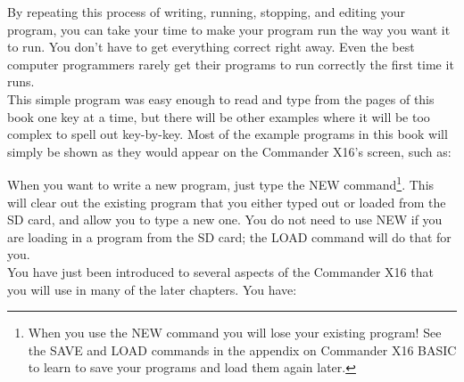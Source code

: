By repeating this process of writing, running, stopping, and editing your
program, you can take your time to make your program run the way you want it to
run.  You don't have to get everything correct right away.  Even the best
computer programmers rarely get their programs to run correctly the first time
it runs.\\

This simple program was easy enough to read and type from the pages of this
book one key at a time, but there will be other examples where it will be too
complex to spell out key-by-key.  Most of the example programs in this book
will simply be shown as they would appear on the Commander X16's screen, such as:\\



When you want to write a new program, just type the {\ttfamily NEW}
command\footnote{When you use the {\ttfamily NEW} command you will lose your
existing program!  See the {\ttfamily SAVE} and {\ttfamily LOAD} commands in
the appendix on Commander X16 BASIC to learn to save your programs and load
them again later.}.  This will clear out the existing program that you either
typed out or loaded from the SD card, and allow you to type a new one.  You do
not need to use {\ttfamily NEW} if you are loading in a program from the SD
card; the {\ttfamily LOAD} command will do that for you.\\

You have just been introduced to several aspects of the Commander X16 that you
will use in many of the later chapters.  You have:

